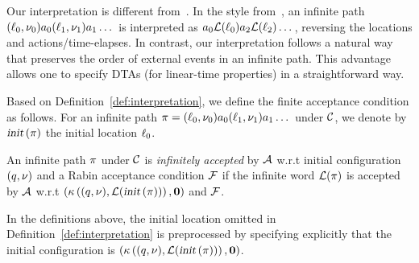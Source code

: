 \begin{remark}
Our interpretation is different from~\cite{DBLP:journals/tse/DonatelliHS09,DBLP:journals/corr/abs-1101-3694,DBLP:conf/hybrid/Fu13}.
In the style from~\cite{DBLP:journals/tse/DonatelliHS09,DBLP:journals/corr/abs-1101-3694,DBLP:conf/hybrid/Fu13}, an infinite path
$(\ell_0,\nu_0)a_0(\ell_1,\nu_1)a_1\dots$ is interpreted as $a_0 \mathcal{L}(\ell_0)a_2 \mathcal{L}(\ell_2)\dots$,
reversing the locations and actions/time-elapses.
In contrast, our interpretation follows a natural way that preserves the order of external events in an infinite path.
This advantage allows one to specify DTAs (for linear-time properties) in a straightforward way.
\end{remark}

Based on Definition~\ref{def:interpretation}, we define the finite acceptance condition as follows.
For an infinite path $\pi=(\ell_0,\nu_0)a_0(\ell_1,\nu_1)a_1\dots$ under $\mathcal{C}$, we denote by $\mbox{\sl init}\left(\pi\right)$ the initial location $\ell_0$.

\vspace{-0.8em}
\begin{definition}\label{def:fnacc}
An infinite path $\pi$ under $\mathcal{C}$ is \emph{infinitely accepted} by $\mathcal{A}$ w.r.t initial configuration $(q,\nu)$ and a Rabin acceptance condition $\mathcal{F}$ if the infinite word $\mathcal{L}(\pi)$ is accepted by $\mathcal{A}$ w.r.t $\left(\kappa\left((q,\nu), \mathcal{L}(\mbox{\sl init}\left(\pi\right))\right),\mathbf{0}\right)$ and $\mathcal{F}$.
\end{definition}


In the definitions above, the initial location omitted in Definition~\ref{def:interpretation} is preprocessed by specifying explicitly that the initial configuration is $\left(\kappa\left((q,\nu), \mathcal{L}(\mbox{\sl init}\left(\pi\right))\right),\mathbf{0}\right)$.

